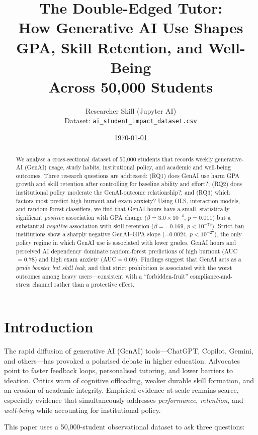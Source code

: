 \documentclass[11pt]{article}
\title{The Double-Edged Tutor:\\
How Generative AI Use Shapes GPA, Skill Retention, and Well-Being\\
Across 50{,}000 Students}
\author{Researcher Skill (Jupyter AI)\\
\small Dataset: \texttt{ai\_student\_impact\_dataset.csv}}
\date{\today}
\begin{document}
\maketitle

\begin{abstract}
We analyse a cross-sectional dataset of 50{,}000 students that records weekly
generative-AI (GenAI) usage, study habits, institutional policy, and academic
and well-being outcomes. Three research questions are addressed: (RQ1) does
GenAI use harm GPA growth and skill retention after controlling for baseline
ability and effort?; (RQ2) does institutional policy moderate the GenAI-outcome
relationship?; and (RQ3) which factors most predict high burnout and exam
anxiety? Using OLS, interaction models, and random-forest classifiers, we find
that GenAI hours have a small, statistically significant \emph{positive}
association with GPA change ($\beta = 3.0\!\times\!10^{-4}$, $p = 0.011$) but a
substantial \emph{negative} association with skill retention
($\beta = -0.169$, $p < 10^{-79}$). Strict-ban institutions show a sharply
negative GenAI--GPA slope ($-0.0024$, $p < 10^{-27}$), the only policy regime
in which GenAI use is associated with lower grades. GenAI hours and perceived
AI dependency dominate random-forest predictions of high burnout
(AUC$=0.78$) and high exam anxiety (AUC$=0.69$). Findings suggest that GenAI
acts as a \emph{grade booster but skill leak}, and that strict prohibition is
associated with the worst outcomes among heavy users---consistent with a
``forbidden-fruit'' compliance-and-stress channel rather than a protective
effect.
\end{abstract}

\section{Introduction}
\label{sec:intro}

The rapid diffusion of generative AI (GenAI) tools---ChatGPT, Copilot,
Gemini, and others---has provoked a polarised debate in higher education.
Advocates point to faster feedback loops, personalised tutoring, and lower
barriers to ideation. Critics warn of cognitive offloading, weaker durable
skill formation, and an erosion of academic integrity. Empirical evidence at
scale remains scarce, especially evidence that simultaneously addresses
\emph{performance}, \emph{retention}, and \emph{well-being} while accounting
for institutional policy.

This paper uses a 50{,}000-student observational dataset to ask three
questions:
\end{document}
